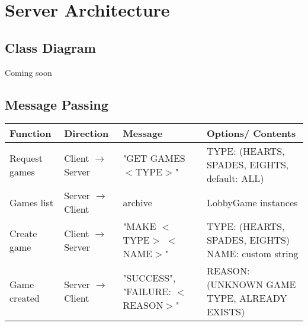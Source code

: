\section{Server Architecture}
\subsection{Class Diagram}
Coming soon
\subsection{Message Passing}
\begin{center}
\begin{tabular}{|m{8em}|m{7em}|m{12em}|m{6em}|}
\hline
Function & Direction & Message & Options/ Contents \\
\hline\hline
Request games & Client $\rightarrow$ Server & "GET GAMES $<$TYPE$>$" & TYPE: (HEARTS, SPADES, EIGHTS, default: ALL)\\
\hline
Games list & Server $\rightarrow$ Client & archive & LobbyGame instances\\
\hline
Create game & Client $\rightarrow$ Server & "MAKE $<$TYPE$>$ $<$NAME$>$" & TYPE: (HEARTS, SPADES, EIGHTS) NAME: custom string\\
\hline
Game created & Server $\rightarrow$ Client & "SUCCESS", "FAILURE: $<$REASON$>$" & REASON: (UNKNOWN GAME TYPE, ALREADY EXISTS)\\
\hline
\end{tabular}
\end{center}
